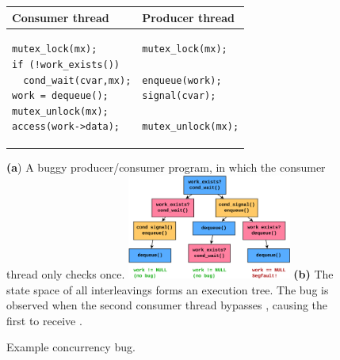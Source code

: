 
\begin{figure}[t]
	\begin{tabular}{l|l}
	Consumer thread & Producer thread \\
	\hline
\begin{lstlisting}
mutex_lock(mx);
if (!work_exists())
  cond_wait(cvar,mx);
work = dequeue();
mutex_unlock(mx);
access(work->data);
\end{lstlisting}
	&
\begin{lstlisting}
mutex_lock(mx);

enqueue(work);
signal(cvar);

mutex_unlock(mx);
\end{lstlisting}
	\end{tabular}
	{\bf (a}) A buggy producer/consumer program, in which the consumer thread only checks  once.
	\includegraphics[width=0.48\textwidth]{execution-tree.pdf}
	{\bf (b)} The state space of all interleavings forms an execution tree. %
	The bug is observed when the second consumer thread bypasses , causing the first to receive .
	\caption{Example concurrency bug.}
	\label{fig:paradise}
\end{figure}

